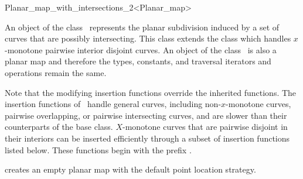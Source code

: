 
\ccRefPageBegin

\begin{ccRefClass}{Planar_map_with_intersections_2<Planar_map>}

\ccDefinition An object  of the class
    \ccClassTemplateName\ represents the planar
    subdivision induced by a set of curves that are possibly intersecting.
    This class extends the class 
    which handles $x$-monotone pairwise interior disjoint
    curves.  %
    An object of the class \ccClassTemplateName\ is also a planar map and
    therefore the types, constants, and traversal iterators and operations remain
    the same.


\ccInheritsFrom

    Note that the modifying insertion functions override the
    inherited functions. The insertion functions of \ccRefName\ handle
    general curves, including non-$x$-monotone curves, pairwise overlapping,
    or pairwise intersecting curves, and are slower than their counterparts
    of the  base class.
    $X$-monotone curves that are pairwise disjoint in their interiors can be
    inserted efficiently through a subset of insertion functions listed below.
    These functions begin with the prefix .

\ccTypes


\ccCreation
{}

  {creates an empty planar map with the default point location strategy.}


\end{ccRefClass}
